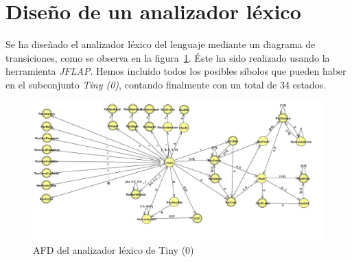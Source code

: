 \section{Diseño de un analizador léxico}

Se ha diseñado el analizador léxico del lenguaje mediante un diagrama de transiciones, como se observa en la figura~\ref{fig:diag}.
Éste ha sido realizado usando la herramienta \textit{JFLAP}. Hemos incluido todos los posibles síbolos que pueden haber en
el subconjunto \textit{Tiny (0)}, contando finalmente con un total de 34 estados.

\begin{figure}[H]
    \centering
    \includegraphics[width=0.7\linewidth]{Secciones/Hito1/Tiny0/Tiny0.jpg}
    \caption{AFD del analizador léxico de Tiny (0)}\label{fig:diag}
\end{figure}